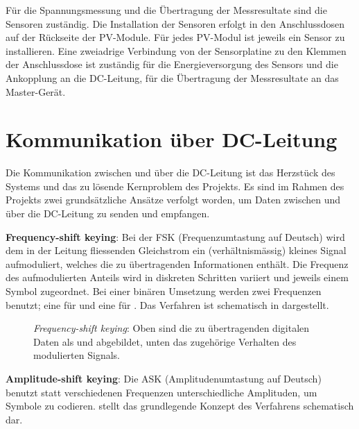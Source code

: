 F\"ur  die  Spannungsmessung  und  die \"Ubertragung  der  Messresultate  sind
die  Sensoren  zust\"andig. Die  Installation  der  Sensoren  erfolgt  in  den
Anschlussdosen  auf der  R\"uckseite der  PV-Module. F\"ur jedes  PV-Modul ist
jeweils  ein  Sensor  zu  installieren. Eine  zweiadrige  Verbindung  von  der
Sensorplatine  zu den  Klemmen  der Anschlussdose  ist  zust\"andig f\"ur  die
Energieversorgung des Sensors und die  Ankopplung an die DC-Leitung, f\"ur die
\"Ubertragung der Messresultate an das Master-Ger\"at.

\clearpage
\section{Kommunikation \"uber DC-Leitung}
\label{sec:commDCLine}

Die Kommunikation zwischen  \Sensor und \Master \"uber die  DC-Leitung ist das
Herzst\"uck des Systems und das zu l\"osende Kernproblem des Projekts. Es sind
im Rahmen  des Projekts  zwei grunds\"atzliche  Ans\"atze verfolgt  worden, um
Daten  zwischen  \Sensor und  \Master  \"uber  die  DC-Leitung zu  senden  und
empfangen.

\textbf{Frequency-shift keying}: Bei  der FSK (Frequenzumtastung  auf Deutsch)
wird  dem in  der Leitung  fliessenden Gleichstrom  ein (verh\"altnism\"assig)
kleines  Signal aufmoduliert,  welches  die  zu \"ubertragenden  Informationen
enth\"alt. Die  Frequenz   des  aufmodulierten   Anteils  wird   in  diskreten
Schritten variiert  und jeweils  einem Symbol zugeordnet. Bei  einer bin\"aren
Umsetzung  werden  zwei  Frequenzen  benutzt; eine  f\"ur    und  eine
f\"ur  .   Das  Verfahren ist  schematisch  in  
dargestellt.

\begin{figure}[h!tb]
    \centering
    
    \caption{%
        \emph{Frequency-shift  keying}: Oben   sind  die   zu  \"ubertragenden
        digitalen  Daten  als    und   abgebildet,  unten  das
        zugeh\"orige Verhalten des  modulierten Signals.%
    }
    \label{fig:fsk:concept}
\end{figure}


\textbf{Amplitude-shift  keying}: Die  ASK (Amplitudenumtastung  auf  Deutsch)
benutzt statt verschiedenen Frequenzen unterschiedliche Amplituden, um Symbole
zu  codieren.    stellt  das  grundlegende  Konzept  des
Verfahrens schematisch dar.

